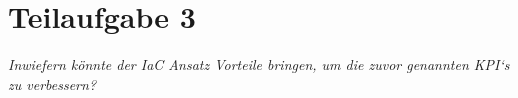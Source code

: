 \chapter{Teilaufgabe 3}

\textit{Inwiefern könnte der IaC Ansatz Vorteile bringen, um die zuvor genannten KPI‘s zu verbessern?}